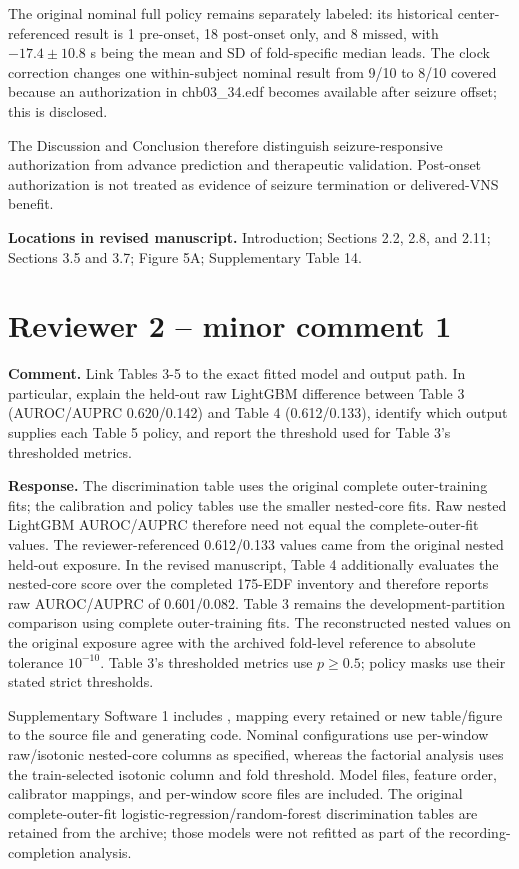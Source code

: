 \documentclass[11pt,a4paper]{article}
\begin{document}
The original nominal full policy remains separately labeled: its historical center-referenced result is 1 pre-onset, 18 post-onset only, and 8 missed, with $-17.4\pm10.8$ s being the mean and SD of fold-specific median leads. The clock correction changes one within-subject nominal result from 9/10 to 8/10 covered because an authorization in chb03\_34.edf becomes available after seizure offset; this is disclosed.

The Discussion and Conclusion therefore distinguish seizure-responsive authorization from advance prediction and therapeutic validation. Post-onset authorization is not treated as evidence of seizure termination or delivered-VNS benefit.

\textbf{Locations in revised manuscript.} Introduction; Sections 2.2, 2.8, and 2.11; Sections 3.5 and 3.7; Figure 5A; Supplementary Table 14.

\section*{Reviewer 2 -- minor comment 1}

\textbf{Comment.} Link Tables 3-5 to the exact fitted model and output path. In particular, explain the held-out raw LightGBM difference between Table 3 (AUROC/AUPRC 0.620/0.142) and Table 4 (0.612/0.133), identify which output supplies each Table 5 policy, and report the threshold used for Table 3's thresholded metrics.

\textbf{Response.} The discrimination table uses the original complete outer-training fits; the calibration and policy tables use the smaller nested-core fits. Raw nested LightGBM AUROC/AUPRC therefore need not equal the complete-outer-fit values. The reviewer-referenced 0.612/0.133 values came from the original nested held-out exposure. In the revised manuscript, Table 4 additionally evaluates the nested-core score over the completed 175-EDF inventory and therefore reports raw AUROC/AUPRC of 0.601/0.082. Table 3 remains the development-partition comparison using complete outer-training fits. The reconstructed nested values on the original exposure agree with the archived fold-level reference to absolute tolerance $10^{-10}$. Table 3's thresholded metrics use $p\geq0.5$; policy masks use their stated strict thresholds.

Supplementary Software 1 includes , mapping every retained or new table/figure to the source file and generating code. Nominal configurations use per-window raw/isotonic nested-core columns as specified, whereas the factorial analysis uses the train-selected isotonic column and fold threshold. Model files, feature order, calibrator mappings, and per-window score files are included. The original complete-outer-fit logistic-regression/random-forest discrimination tables are retained from the archive; those models were not refitted as part of the recording-completion analysis.
\end{document}
